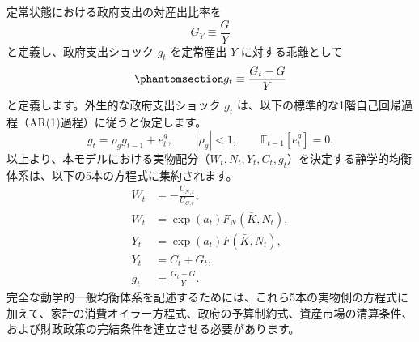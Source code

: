 \documentclass[
  japanese,
  lualatex,
  ja=standard,
  12pt,
  a4paper]{ltjsarticle}
\begin{document}
定常状態における政府支出の対産出比率を \[
G_Y \equiv \frac{G}{Y}
\] と定義し、政府支出ショック \(g_t\) を定常産出 \(Y\)
に対する乖離として
\begin{equation}\protect\phantomsection\label{eq-government-spending-shock}{
g_t \equiv \frac{G_t - G}{Y}
}\end{equation} と定義します。外生的な政府支出ショック \(g_t\)
は、以下の標準的な1階自己回帰過程（AR(1)過程）に従うと仮定します。 \[
g_t = \rho_g g_{t-1} + e_t^g, \qquad |\rho_g| < 1, \qquad \mathbb{E}_{t-1}[e_t^g] = 0.
\]
以上より、本モデルにおける実物配分（\(W_t, N_t, Y_t, C_t, g_t\)）を決定する静学的均衡体系は、以下の5本の方程式に集約されます。
\[
\begin{aligned}
W_t &= -\frac{U_{N,t}}{U_{C,t}},\\
W_t &= \exp(a_t) F_N(\bar{K}, N_t),\\
Y_t &= \exp(a_t) F(\bar{K}, N_t),\\
Y_t &= C_t + G_t,\\
g_t &= \frac{G_t - G}{Y}.
\end{aligned}
\]
完全な動学的一般均衡体系を記述するためには、これら5本の実物側の方程式に加えて、家計の消費オイラー方程式、政府の予算制約式、資産市場の清算条件、および財政政策の完結条件を連立させる必要があります。
\end{document}
